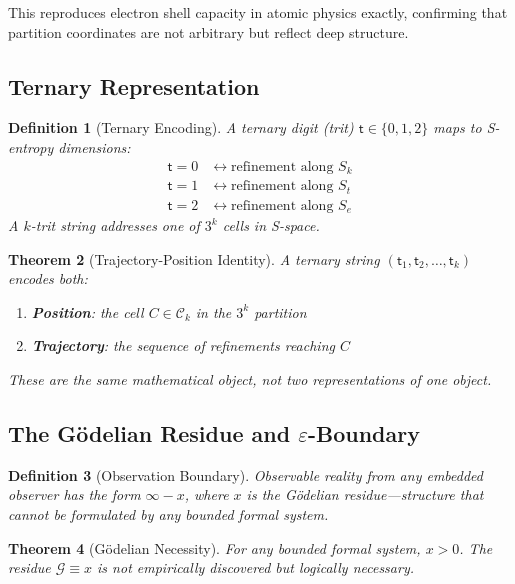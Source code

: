 \documentclass[twocolumn,10pt]{article}
\newtheorem{theorem}{Theorem}[section]
\newtheorem{definition}[theorem]{Definition}
\theoremstyle{remark}
\newcommand{\Sk}{S_k}
\newcommand{\St}{S_t}
\newcommand{\Se}{S_e}
\newcommand{\eps}{\varepsilon}
\newcommand{\Gres}{\mathcal{G}}
\newcommand{\tmark}{\mathsf{t}}
\begin{document}
This reproduces electron shell capacity in atomic physics exactly, confirming that partition coordinates are not arbitrary but reflect deep structure.

\subsection{Ternary Representation}

\begin{definition}[Ternary Encoding]
A ternary digit (trit) $\tmark \in \{0, 1, 2\}$ maps to S-entropy dimensions:
\begin{align}
\tmark = 0 &\leftrightarrow \text{refinement along } \Sk \\
\tmark = 1 &\leftrightarrow \text{refinement along } \St \\
\tmark = 2 &\leftrightarrow \text{refinement along } \Se
\end{align}
A $k$-trit string addresses one of $3^k$ cells in S-space.
\end{definition}

\begin{theorem}[Trajectory-Position Identity]
\label{thm:trajectory_position}
A ternary string $(\tmark_1, \tmark_2, \ldots, \tmark_k)$ encodes both:
\begin{enumerate}
    \item \textbf{Position}: the cell $C \in \mathcal{C}_k$ in the $3^k$ partition
    \item \textbf{Trajectory}: the sequence of refinements reaching $C$
\end{enumerate}
These are the same mathematical object, not two representations of one object.
\end{theorem}

\subsection{The Gödelian Residue and $\eps$-Boundary}

\begin{definition}[Observation Boundary]
Observable reality from any embedded observer has the form $\infty - x$, where $x$ is the Gödelian residue---structure that cannot be formulated by any bounded formal system.
\end{definition}

\begin{theorem}[Gödelian Necessity]
\label{thm:godel}
For any bounded formal system, $x > 0$. The residue $\Gres \equiv x$ is not empirically discovered but logically necessary.
\end{theorem}
\end{document}

